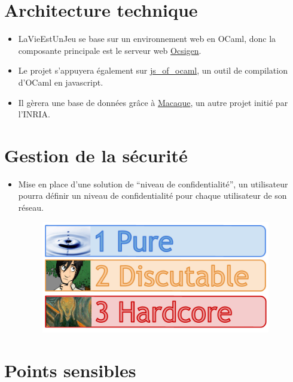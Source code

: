 \documentclass{life-fr}
\begin{document}
\section{Architecture technique}

\begin{itemize}
  \item LaVieEstUnJeu se base sur un environnement web en OCaml, donc la composante principale est le serveur web \href{http://ocsigen.org/}{Ocsigen}.
  \item Le projet s’appuyera également sur \href{http://ocsigen.org/js_of_ocaml/}{js\_of\_ocaml}, un outil de compilation d’OCaml en javascript.
  \item Il gèrera une base de données grâce à \href{http://ocsigen.org/macaque/}{Macaque}, un autre projet initié par l’INRIA.
\end{itemize}

\section{Gestion de la sécurité}

\begin{itemize}
  \item Mise en place d’une solution de “niveau de confidentialité”, un utilisateur pourra définir un niveau de confidentialité pour chaque utilisateur de son réseau. 

\begin{figure}[H]
  \begin{center}
    \includegraphics[width=10cm]{img/confidentialite.png}
  \end{center}
\end{figure}

\end{itemize}

\section{Points sensibles}
\end{document}
